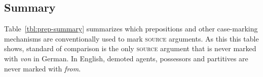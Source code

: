 \documentclass[lucida]{sp} %
\begin{document}
%
%
%
%

\subsection{Summary}

Table~\ref{tbl:prep-summary} summarizes which prepositions and other case-marking mechanisms are conventionally used to mark \textsc{source} arguments. As this this table shows, standard of comparison is the only \textsc{source} argument that is never marked with \textit{von} in German. In English, demoted agents, possessors and partitives are never marked with \textit{from}.
\end{document}
